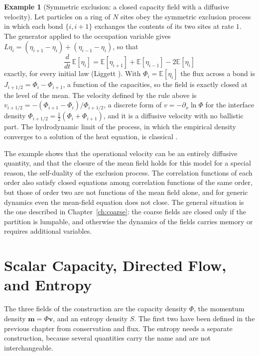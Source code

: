 \documentclass[11pt,oneside]{book}
\theoremstyle{definition}
\newtheorem{example}[theorem]{Example}
\theoremstyle{remark}
\begin{document}
\begin{example}[Symmetric exclusion: a closed capacity field with a diffusive velocity]\label{ex:sep}
Let particles on a ring of $N$ sites obey the symmetric exclusion process in which each bond $\{i,i+1\}$ exchanges the contents of its two sites at rate $1$. The generator applied to the occupation variable gives $L\eta_i=(\eta_{i+1}-\eta_i)+(\eta_{i-1}-\eta_i)$, so that
\[
\frac{d}{dt}\,\mathbb E[\eta_i]=\mathbb E[\eta_{i+1}]+\mathbb E[\eta_{i-1}]-2\mathbb E[\eta_i]
\]
exactly, for every initial law (Liggett \cite{liggett1985}). With $\Phi_i=\mathbb E[\eta_i]$ the flux across a bond is $J_{i+1/2}=\Phi_i-\Phi_{i+1}$, a function of the capacities, so the field is exactly closed at the level of the mean. The velocity defined by the rule above is $v_{i+1/2}=-(\Phi_{i+1}-\Phi_i)/\Phi_{i+1/2}$, a discrete form of $v=-\partial_x\ln\Phi$ for the interface density $\Phi_{i+1/2}=\tfrac12(\Phi_i+\Phi_{i+1})$, and it is a diffusive velocity with no ballistic part. The hydrodynamic limit of the process, in which the empirical density converges to a solution of the heat equation, is classical \cite{kipnis1999}.
\end{example}

The example shows that the operational velocity can be an entirely diffusive quantity, and that the closure of the mean field holds for this model for a special reason, the self-duality of the exclusion process. The correlation functions of each order also satisfy closed equations among correlation functions of the same order, but those of order two are not functions of the mean field alone, and for generic dynamics even the mean-field equation does not close. The general situation is the one described in Chapter~\ref{ch:coarse}: the coarse fields are closed only if the partition is lumpable, and otherwise the dynamics of the fields carries memory or requires additional variables.

\chapter{Scalar Capacity, Directed Flow, and Entropy}\label{ch:fields}

The three fields of the construction are the capacity density $\Phi$, the momentum density $\mathbf m=\Phi\mathbf v$, and an entropy density $S$. The first two have been defined in the previous chapter from conservation and flux. The entropy needs a separate construction, because several quantities carry the name and are not interchangeable.
\end{document}

